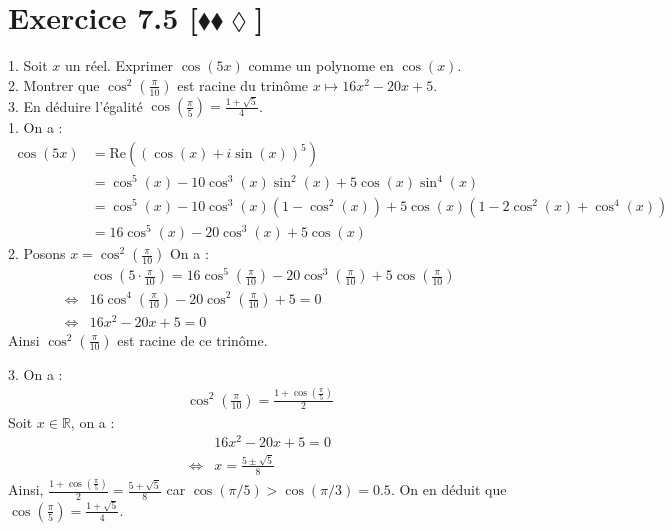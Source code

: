 \documentclass[10pt]{article}
\begin{document}
\section*{Exercice 7.5 [$\blacklozenge\blacklozenge\lozenge$]}
\begin{tcolorbox}[enhanced, width=7in, center, size=fbox, fontupper=\large, drop shadow southwest]
    1. Soit $x$ un réel. Exprimer $\cos(5x)$ comme un polynome en $\cos(x)$.\\
    2. Montrer que $\cos^2\left(\frac{\pi}{10}\right)$ est racine du trinôme $x \mapsto 16x^2 - 20x + 5$.\\
    3. En déduire l'égalité $\cos\left(\frac{\pi}{5}\right)=\frac{1+\sqrt{5}}{4}$.\\
    1. On a :
    \begin{align*}
        \cos(5x) &= \text{Re}\left((\cos(x)+i\sin(x))^5\right) \\
        &= \cos^5(x) - 10\cos^3(x)\sin^2(x) + 5\cos(x)\sin^4(x)\\
        &= \cos^5(x) - 10\cos^3(x)(1-\cos^2(x)) + 5\cos(x)(1 - 2\cos^2(x) + \cos^4(x))\\
        &= 16\cos^5(x) - 20\cos^3(x) + 5\cos(x)
    \end{align*}
    2. Posons $x = \cos^2\left( \frac{\pi}{10} \right)$ On a :
    \begin{align*}
        &\cos\left(5\cdot\frac{\pi}{10}\right)=16\cos^5\left(\frac{\pi}{10}\right)-20\cos^3\left( \frac{\pi}{10} \right) + 5\cos\left( \frac{\pi}{10} \right)\\
        \iff&16\cos^4\left( \frac{\pi}{10} \right) - 20\cos^2 \left( \frac{\pi}{10} \right) + 5 = 0\\
        \iff& 16x^2 - 20x + 5 = 0
    \end{align*}
    Ainsi $\cos^2\left( \frac{\pi}{10} \right)$ est racine de ce trinôme.
\end{tcolorbox}

\begin{tcolorbox}[enhanced, width=7in, center, size=fbox, fontupper=\large, drop shadow southwest]
    3. On a :
    \begin{align*}
        \cos^2 \left( \frac{\pi}{10} \right) = \frac{1+\cos(\frac{\pi}{5})}{2}
    \end{align*}
    Soit $x\in\mathbb{R}$, on a :
    \begin{align*}
        &16x^2-20x+5=0\\
        \iff& x = \frac{5 \pm \sqrt{5}}{8}
    \end{align*}
    Ainsi, $\frac{1+\cos\left(\frac{\pi}{5}\right)}{2}=\frac{5+\sqrt{5}}{8}$ car $\cos(\pi/5) > \cos(\pi/3) = 0.5$. On en déduit que $\cos\left( \frac{\pi}{5} \right)=\frac{1+\sqrt{5}}{4}$.
\end{tcolorbox}

\end{document}
